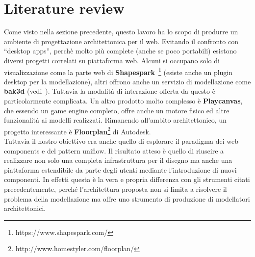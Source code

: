 \section{Literature review}\label{sec:literature}

Come visto nella sezione precedente, questo lavoro ha lo scopo di produrre un ambiente di progettazione architettonica per il web. Evitando il confronto con ``desktop apps'', perch\`e molto pi\`u complete (anche se poco portabili) esistono diversi progetti correlati su piattaforma web. Alcuni si occupano solo di visualizzazione come la parte web di \textbf{Shapespark}~\footnote{https://www.shapespark.com/} (esiste anche un plugin desktop per la modellazione), altri offrono anche un servizio di modellazione come \textbf{bak3d} (vedi~\cite{Spini:2016:WIA:2945292.2945309}). Tuttavia la modalit\`a di interazione offerta da questo \`e particolarmente complicata. Un altro prodotto molto complesso \`e \textbf{Playcanvas}, che essendo un game engine completo, offre anche un motore fisico ed altre funzionalit\`a ai modelli realizzati. Rimanendo all'ambito architettonico, un progetto interessante \`e \textbf{Floorplan}\footnote{http://www.homestyler.com/floorplan/} di Autodesk.\\
Tuttavia il nostro obiettivo era anche quello di esplorare il paradigma dei web components e del pattern uniflow. Il risultato atteso \`e quello di riuscire a realizzare non solo una completa infrastruttura per il disegno ma anche una piattaforma estendibile da parte degli utenti mediante l'introduzione di nuovi componenti. In effetti questa \`e la vera e propria differenza con gli strumenti citati precedentemente, perché l'architettura proposta non si limita a risolvere il problema della modellazione ma offre uno strumento di produzione di modellatori architettonici.